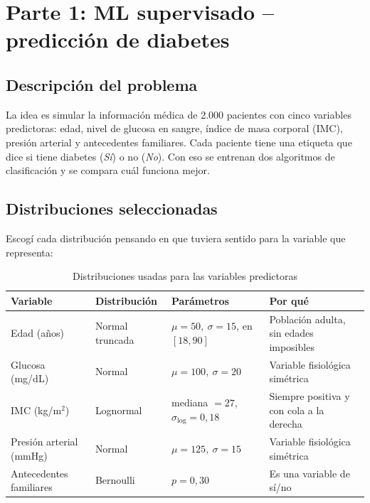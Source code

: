 \documentclass[11pt,letterpaper]{article}
\begin{document}
\section{Parte 1: ML supervisado -- predicción de diabetes}

\subsection{Descripción del problema}

La idea es simular la información médica de 2.000 pacientes con cinco variables predictoras: edad, nivel de
glucosa en sangre, índice de masa corporal (IMC), presión arterial y antecedentes familiares. Cada paciente
tiene una etiqueta que dice si tiene diabetes (\emph{Sí}) o no (\emph{No}). Con eso se entrenan dos
algoritmos de clasificación y se compara cuál funciona mejor.

\subsection{Distribuciones seleccionadas}

Escogí cada distribución pensando en que tuviera sentido para la variable que representa:

\begin{table}[H]
\centering
\caption{Distribuciones usadas para las variables predictoras}
\small
\begin{tabularx}{\linewidth}{lllX}
\toprule
\textbf{Variable} & \textbf{Distribución} & \textbf{Parámetros} & \textbf{Por qué} \\
\midrule
Edad (años)            & Normal truncada & $\mu=50,\ \sigma=15$, en $[18, 90]$ & Población adulta, sin edades imposibles \\
Glucosa (mg/dL)        & Normal          & $\mu=100,\ \sigma=20$                & Variable fisiológica simétrica \\
IMC (kg/m$^2$)         & Lognormal       & mediana $=27$, $\sigma_{\log}=0{,}18$ & Siempre positiva y con cola a la derecha \\
Presión arterial (mmHg)& Normal          & $\mu=125,\ \sigma=15$                & Variable fisiológica simétrica \\
Antecedentes familiares& Bernoulli       & $p=0{,}30$                           & Es una variable de sí/no \\
\bottomrule
\end{tabularx}
\end{table}
\end{document}
